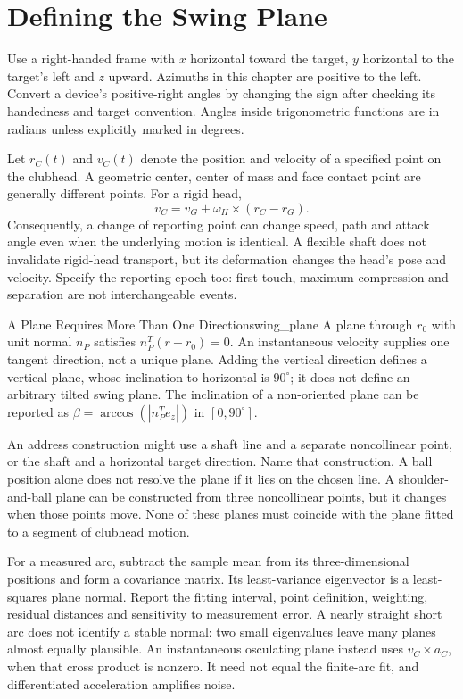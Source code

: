 \section{Defining the Swing Plane}

Use a right-handed frame with $x$ horizontal toward the target, $y$ horizontal
to the target's left and $z$ upward. Azimuths in this chapter are positive to
the left. Convert a device's positive-right angles by changing the sign after
checking its handedness and target convention. Angles inside trigonometric
functions are in radians unless explicitly marked in degrees.

Let $r_C(t)$ and $v_C(t)$ denote the position and velocity of a specified point
on the clubhead. A geometric center, center of mass and face contact point are
generally different points. For a rigid head,
\[
v_C=v_G+\omega_H\times(r_C-r_G).
\]
Consequently, a change of reporting point can change speed, path and attack
angle even when the underlying motion is identical. A flexible shaft does not
invalidate rigid-head transport, but its deformation changes the head's pose
and velocity. Specify the reporting epoch too: first touch, maximum compression
and separation are not interchangeable events.

\begin{definition}{A Plane Requires More Than One Direction}{swing_plane}
A plane through $r_0$ with unit normal $n_P$ satisfies
$n_P^T(r-r_0)=0$. An instantaneous velocity supplies one tangent direction,
not a unique plane. Adding the vertical direction defines a vertical plane,
whose inclination to horizontal is $90^\circ$; it does not define an arbitrary
tilted swing plane. The inclination of a non-oriented plane can be reported as
$\beta=\arccos(|n_P^Te_z|)$ in $[0,90^\circ]$.
\end{definition}

An address construction might use a shaft line and a separate noncollinear
point, or the shaft and a horizontal target direction. Name that construction.
A ball position alone does not resolve the plane if it lies on the chosen line.
A shoulder-and-ball plane can be constructed from three noncollinear points,
but it changes when those points move. None of these planes must coincide with
the plane fitted to a segment of clubhead motion.

For a measured arc, subtract the sample mean from its three-dimensional
positions and form a covariance matrix. Its least-variance eigenvector is a
least-squares plane normal. Report the fitting interval, point definition,
weighting, residual distances and sensitivity to measurement error. A nearly
straight short arc does not identify a stable normal: two small eigenvalues
leave many planes almost equally plausible. An instantaneous osculating plane
instead uses $v_C\times a_C$, when that cross product is nonzero. It need not
equal the finite-arc fit, and differentiated acceleration amplifies noise.

